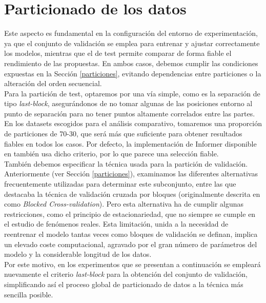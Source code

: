 \section{Particionado de los datos}

Este aspecto es fundamental en la configuración del entorno de experimentación, ya que el conjunto de validación se emplea para entrenar y ajustar correctamente los modelos, mientras que el de test permite comparar de forma fiable el rendimiento de las propuestas. En ambos casos, debemos cumplir las condiciones expuestas en la Sección \ref{particiones}, evitando dependencias entre particiones o la alteración del orden secuencial.\\

Para la partición de test, optaremos por una vía simple, como es la separación de tipo \textit{last-block}, asegurándonos de no tomar algunas de las posiciones entorno al punto de separación para no tener puntos altamente correlados entre las partes. En los datasets escogidos para el análisis comparativo, tomaremos una proporción de particiones de 70-30, que será más que suficiente para obtener resultados fiables en todos los casos. Por defecto, la implementación de Informer disponible en \cite{zhouhaoyi2020informer} también usa dicho criterio, por lo que parece una selección fiable.\\
 
También debemos especificar la técnica usada para la partición de validación. Anteriormente (ver Sección \ref{particiones}), examinamos las diferentes alternativas frecuentemente utilizadas para determinar este subconjunto, entre las que destacaba la técnica de validación cruzada por bloques (originalmente descrita en \cite{bergmeir2012use} como \textit{Blocked Cross-validation}). Pero esta alternativa ha de cumplir algunas restricciones, como el principio de estacionariedad, que no siempre se cumple en el estudio de fenómenos reales. Esta limitación, unida a la necesidad de reentrenar el modelo tantas veces como bloques de validación se definan, implica un elevado coste computacional, agravado por el gran número de parámetros del modelo y la considerable longitud de los datos.\\

Por este motivo, en los experimentos que se presentan a continuación se empleará nuevamente el criterio \textit{last-block} para la obtención del conjunto de validación, simplificando así el proceso global de particionado de datos a la técnica más sencilla posible.

